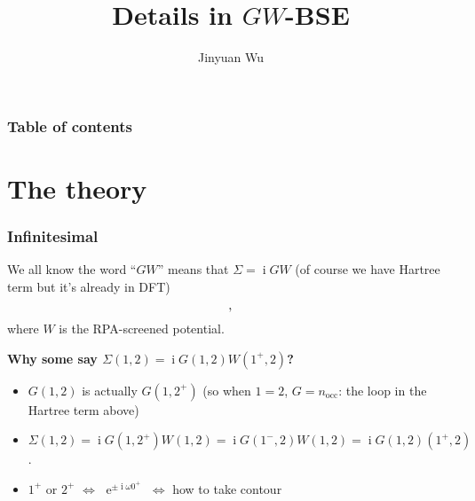 \documentclass[t]{beamer}
\title{Details in $GW$-BSE}
\author{Jinyuan Wu}
\DeclareMathOperator{\ee}{e}
\DeclareMathOperator{\ii}{i}
\begin{document}
\maketitle

\begin{frame}
    \frametitle{Table of contents}

    \tableofcontents

\end{frame}

\section{The theory}

\begin{frame}
\frametitle{Infinitesimal}

We all know the word ``$GW$'' means that $\Sigma = \ii G W$ 
(of course we have Hartree term but it's already in DFT)

\begin{equation}
    \protect,
\end{equation}
where $W$ is the RPA-screened potential.

\vspace{0.25cm}
\textbf{Why some say $\Sigma(1, 2) = \ii G(1, 2) W(1^+, 2)$?}

\begin{itemize}
    \item $G(1, 2)$ is actually $G(1, 2^+)$ (so when $1=2$, $G = n_{\text{occ}}$: 
    the loop in the Hartree term above)
    \item $\Sigma(1, 2) = \ii G(1, 2^+) W(1, 2) = \ii G(1^-, 2) W(1, 2) = \ii G(1, 2) (1^+, 2)$.
    \item $1^+$ or $2^+$ $\Leftrightarrow$ $\ee^{\pm \ii \omega 0^+}$
        $\Leftrightarrow$ how to take contour 
\end{itemize}

\end{frame}
\end{document}
